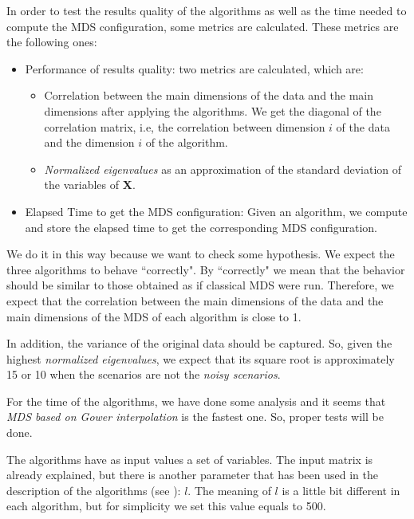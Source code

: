 \documentclass[11pt]{report}
\begin{document}
\indent In order to test the results quality of the algorithms as well as 
the time needed to compute the MDS configuration, some metrics are calculated. 
These metrics are the following ones:

\begin{itemize}
\item Performance of results quality: two metrics are calculated, which are:
\begin{itemize}


\item Correlation between the main dimensions of the data and the
main dimensions after applying the algorithms. We get the diagonal of the 
correlation matrix, i.e, the correlation between dimension $i$ of the data 
and the dimension $i$ of the algorithm. 

\item \textit{Normalized eigenvalues} as an approximation of the standard 
deviation of the variables of \textbf{X}.
\end{itemize}

\item Elapsed Time to get the MDS configuration: Given an algorithm, we compute 
and store the elapsed time to get the corresponding MDS configuration.

\end{itemize}

\indent We do it in this way because we want to check some hypothesis. We 
expect the three algorithms to behave ``correctly". By ``correctly" we mean 
that the behavior should be similar to those obtained as if classical MDS 
were run. Therefore, we expect that the correlation between the main 
dimensions of the data and the main dimensions of the MDS of each algorithm 
is close to 1.

\indent In addition, the variance of the original data should be captured. 
So, given the highest \textit{normalized eigenvalues}, we expect that 
its square root is approximately 15 or 10 when the scenarios are not the 
\textit{noisy scenarios}. 

\indent For the time of the algorithms, we have done some analysis and it seems 
that \textit{MDS based on Gower interpolation} is the fastest one.
So, proper tests will be done.


\indent The algorithms have as input values a set of variables. The input matrix 
is already explained, but there is another parameter that has been used in 
the description of the algorithms (see ): $l$. The meaning of 
$l$ is a little bit different in each algorithm, but for simplicity we 
set this value equals to 500. 
\end{document}
